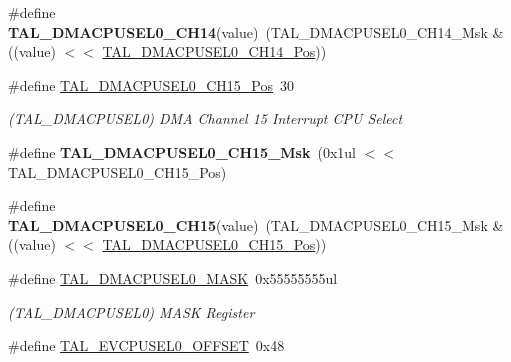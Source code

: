 \begin{DoxyCompactItemize}
\item 
\hypertarget{group___s_a_m_l21___t_a_l_ga54401abf89f7995885a9b02dddf59d12}{}\#define {\bfseries T\+A\+L\+\_\+\+D\+M\+A\+C\+P\+U\+S\+E\+L0\+\_\+\+C\+H14}(value)~(T\+A\+L\+\_\+\+D\+M\+A\+C\+P\+U\+S\+E\+L0\+\_\+\+C\+H14\+\_\+\+Msk \& ((value) $<$$<$ \hyperlink{group___s_a_m_l21___t_a_l_gac7f5dd501c8f977191de62ea369fed39}{T\+A\+L\+\_\+\+D\+M\+A\+C\+P\+U\+S\+E\+L0\+\_\+\+C\+H14\+\_\+\+Pos}))\label{group___s_a_m_l21___t_a_l_ga54401abf89f7995885a9b02dddf59d12}

\item 
\hypertarget{group___s_a_m_l21___t_a_l_ga4314b5a7e7e7c71b3ab62718a968b7ff}{}\#define \hyperlink{group___s_a_m_l21___t_a_l_ga4314b5a7e7e7c71b3ab62718a968b7ff}{T\+A\+L\+\_\+\+D\+M\+A\+C\+P\+U\+S\+E\+L0\+\_\+\+C\+H15\+\_\+\+Pos}~30\label{group___s_a_m_l21___t_a_l_ga4314b5a7e7e7c71b3ab62718a968b7ff}

\begin{DoxyCompactList}\small\item\em (T\+A\+L\+\_\+\+D\+M\+A\+C\+P\+U\+S\+E\+L0) D\+M\+A Channel 15 Interrupt C\+P\+U Select \end{DoxyCompactList}\item 
\hypertarget{group___s_a_m_l21___t_a_l_gad1b0b368b74a3cfd8bc379b67bbca942}{}\#define {\bfseries T\+A\+L\+\_\+\+D\+M\+A\+C\+P\+U\+S\+E\+L0\+\_\+\+C\+H15\+\_\+\+Msk}~(0x1ul $<$$<$ T\+A\+L\+\_\+\+D\+M\+A\+C\+P\+U\+S\+E\+L0\+\_\+\+C\+H15\+\_\+\+Pos)\label{group___s_a_m_l21___t_a_l_gad1b0b368b74a3cfd8bc379b67bbca942}

\item 
\hypertarget{group___s_a_m_l21___t_a_l_gac2e9f0a3bf14b9ab82e5b3746563114b}{}\#define {\bfseries T\+A\+L\+\_\+\+D\+M\+A\+C\+P\+U\+S\+E\+L0\+\_\+\+C\+H15}(value)~(T\+A\+L\+\_\+\+D\+M\+A\+C\+P\+U\+S\+E\+L0\+\_\+\+C\+H15\+\_\+\+Msk \& ((value) $<$$<$ \hyperlink{group___s_a_m_l21___t_a_l_ga4314b5a7e7e7c71b3ab62718a968b7ff}{T\+A\+L\+\_\+\+D\+M\+A\+C\+P\+U\+S\+E\+L0\+\_\+\+C\+H15\+\_\+\+Pos}))\label{group___s_a_m_l21___t_a_l_gac2e9f0a3bf14b9ab82e5b3746563114b}

\item 
\hypertarget{group___s_a_m_l21___t_a_l_gaf0244cbf6178a5f6e449663643fc15a3}{}\#define \hyperlink{group___s_a_m_l21___t_a_l_gaf0244cbf6178a5f6e449663643fc15a3}{T\+A\+L\+\_\+\+D\+M\+A\+C\+P\+U\+S\+E\+L0\+\_\+\+M\+A\+S\+K}~0x55555555ul\label{group___s_a_m_l21___t_a_l_gaf0244cbf6178a5f6e449663643fc15a3}

\begin{DoxyCompactList}\small\item\em (T\+A\+L\+\_\+\+D\+M\+A\+C\+P\+U\+S\+E\+L0) M\+A\+S\+K Register \end{DoxyCompactList}\item 
\hypertarget{group___s_a_m_l21___t_a_l_gad3a18bc5a9ca484e11bcf5ba83c5fcd1}{}\#define \hyperlink{group___s_a_m_l21___t_a_l_gad3a18bc5a9ca484e11bcf5ba83c5fcd1}{T\+A\+L\+\_\+\+E\+V\+C\+P\+U\+S\+E\+L0\+\_\+\+O\+F\+F\+S\+E\+T}~0x48\label{group___s_a_m_l21___t_a_l_gad3a18bc5a9ca484e11bcf5ba83c5fcd1}


\end{DoxyCompactItemize}
